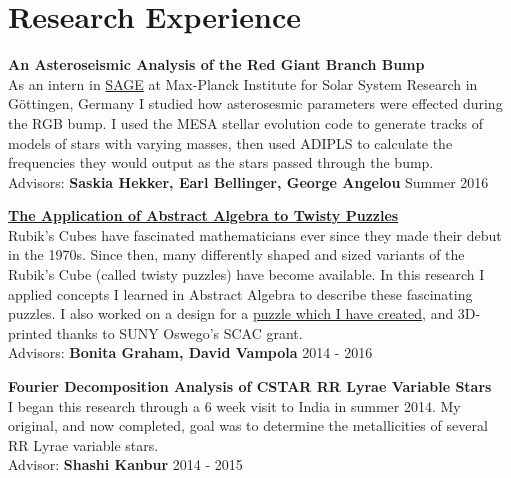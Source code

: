 \documentclass[8pt]{article}
\renewenvironment{itemize}{
  \begin{list}{}{
    \setlength{\leftmargin}{1.5em}
  }
}{
  \end{list}
}
\begin{document}





\section*{Research Experience}
\begin{itemize}

\item \textbf{An Asteroseismic Analysis of the Red Giant Branch Bump}\\
As an intern in \href{http://www.mps.mpg.de/sage}{SAGE} at Max-Planck Institute for Solar System Research in G{\"o}ttingen, Germany I studied how asterosesmic parameters were effected during the RGB bump. I used the MESA
stellar evolution code to generate tracks of models of stars with varying masses, then used ADIPLS to calculate the frequencies they would output as the stars passed through the
bump.\\
Advisors: \textbf{Saskia Hekker, Earl Bellinger, George Angelou} \hfill Summer 2016

\item \href{https://kroffo.github.io/docs/thesis.pdf}{\textbf{The Application of Abstract Algebra to Twisty Puzzles}}\\
Rubik's Cubes have fascinated mathematicians ever since they made their debut in the 1970s. Since then, many differently shaped and sized variants of the Rubik's Cube (called twisty puzzles) have become available. In this research I applied concepts I learned in Abstract Algebra to describe these fascinating puzzles. I also worked on a design for a \href{https://www.youtube.com/watch?v=17ll6TWm45M}{puzzle which I have created}, and 3D-printed thanks to SUNY Oswego's SCAC grant.\\
Advisors: \textbf{Bonita Graham, David Vampola} \hfill 2014 - 2016

\item \textbf{Fourier Decomposition Analysis of CSTAR RR Lyrae Variable Stars}\\
I began this research through a 6 week visit to India in summer 2014. My original, and now completed, goal was to determine the metallicities of several RR Lyrae variable stars.\\
Advisor: \textbf{Shashi Kanbur} \hfill 2014 - 2015

\end{itemize}
\end{document}
